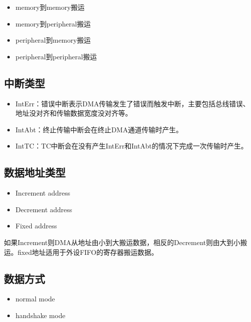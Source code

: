\documentclass[
  12pt,
]{book}
\begin{document}
\begin{itemize}
\item
  memory到memory搬运
\item
  memory到peripheral搬运
\item
  peripheral到memory搬运
\item
  peripheral到peripheral搬运
\end{itemize}

\hypertarget{ux4e2dux65adux7c7bux578b}{%
\subsection{中断类型}\label{ux4e2dux65adux7c7bux578b}}

\begin{itemize}
\item
  IntErr：错误中断表示DMA传输发生了错误而触发中断，主要包括总线错误、地址没对齐和传输数据宽度没对齐等。
\item
  IntAbt：终止传输中断会在终止DMA通道传输时产生。
\item
  IntTC：TC中断会在没有产生IntErr和IntAbt的情况下完成一次传输时产生。
\end{itemize}

\hypertarget{ux6570ux636eux5730ux5740ux7c7bux578b}{%
\subsection{数据地址类型}\label{ux6570ux636eux5730ux5740ux7c7bux578b}}

\begin{itemize}
\item
  Increment address
\item
  Decrement address
\item
  Fixed address
\end{itemize}

如果Increment则DMA从地址由小到大搬运数据，相反的Decrement则由大到小搬运。fixed地址适用于外设FIFO的寄存器搬运数据。

\hypertarget{ux6570ux636eux65b9ux5f0f}{%
\subsection{数据方式}\label{ux6570ux636eux65b9ux5f0f}}

\begin{itemize}
\item
  normal mode
\item
  handshake mode
\end{itemize}
\end{document}
